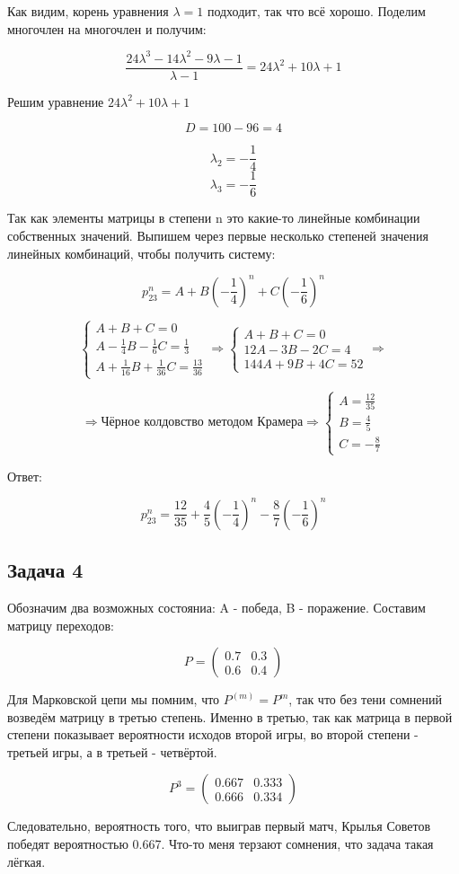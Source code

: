 \documentclass[a4paper,12pt]{article}
\begin{document}
Как видим, корень уравнения $ \lambda = 1 $ подходит, так что всё хорошо. Поделим многочлен на многочлен и получим:


\[ \frac{24 \lambda^3 - 14\lambda^2 - 9\lambda - 1}{\lambda - 1} = 24\lambda^2 + 10\lambda + 1 \]

Решим уравнение $ 24\lambda^2 + 10\lambda + 1 $

\[ D = 100 - 96 = 4 \]

\[ \lambda_{2}  = -\frac{1}{4}\]
\[ \lambda_{3}  = -\frac{1}{6}\]

Так как элементы матрицы в степени n это какие-то линейные комбинации собственных значений. Выпишем через первые несколько степеней значения линейных комбинаций, чтобы получить систему:

\[ p^n_{23} = A + B \left(-\frac{1}{4}\right)^n + C\left(-\frac{1}{6}\right)^n\]

\[ \begin{cases}
A + B + C = 0\\
A - \frac{1}{4}B - \frac{1}{6}C = \frac{1}{3}\\
A + \frac{1}{16}B + \frac{1}{36}C = \frac{13}{36}
\end{cases} \Rightarrow \begin{cases}
A + B + C = 0\\
12A - 3B - 2C = 4\\
144A + 9B + 4C = 52
\end{cases} \Rightarrow  \]

\[ \Rightarrow \text{Чёрное колдовство методом Крамера} \Rightarrow \begin{cases}
A = \frac{12}{35}\\
B = \frac{4}{5}\\
C = -\frac{8}{7}
\end{cases}\]

Ответ:

\[ p^n_{23} = \frac{12}{35} + \frac{4}{5} \left(-\frac{1}{4}\right)^n  -\frac{8}{7} \left(-\frac{1}{6}\right)^n\]


\subsection{Задача 4}

Обозначим два возможных состояниа: A - победа, B - поражение. Составим матрицу переходов:

\[ P = \begin{pmatrix}
0.7 & 0.3 \\
0.6 & 0.4
\end{pmatrix} \]


Для Марковской цепи мы помним, что $ P^{(m)} = P^m$, так что без тени сомнений возведём матрицу в третью степень. Именно в третью, так как матрица в первой степени показывает вероятности исходов второй игры, во второй степени - третьей игры, а в третьей - четвёртой.

\[ P^3 = \begin{pmatrix}
0.667 & 0.333 \\
0.666 & 0.334
\end{pmatrix} \]

Следовательно, вероятность того, что выиграв первый матч, Крылья Советов победят вероятностью 0.667. Что-то меня терзают сомнения, что задача такая лёгкая.
\end{document}

